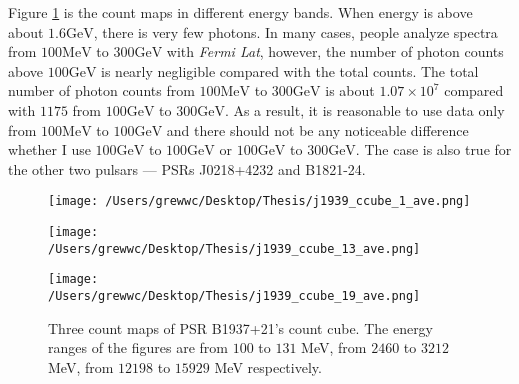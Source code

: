 \documentclass[12pt]{report}
\begin{document}
              Figure \ref{fig: j1939_count_cube_ave} is the count maps in different energy bands.
              When energy is above about $1.6\mbox{GeV}$, there is very few photons. In many cases,
              people analyze spectra from $100\mbox{MeV}$ to $300\mbox{GeV}$ with 
              \textit{Fermi Lat}, however, the number of photon counts above $100\mbox{GeV}$ is 
              nearly negligible compared with the total counts. The total number of photon counts 
              from $100\mbox{MeV}$ to $300\mbox{GeV}$ is about $1.07\times10^7$ compared with 
              $1175$ from $100\mbox{GeV}$ to $300\mbox{GeV}$. As a result, it is reasonable to 
              use data only from $100\mbox{MeV}$ to $100\mbox{GeV}$ and there should not be any 
              noticeable difference whether I use $100\mbox{GeV}$ to $100\mbox{GeV}$ or 
              $100\mbox{GeV}$ to $300\mbox{GeV}$. The case is also true for 
              the other two pulsars --- PSRs J0218+4232 and B1821-24. 

            \begin{figure}[!htp]
              \begin{minipage}{0.32\textwidth}
                \begin{center} 
                  \texttt{[image: /Users/grewwc/Desktop/Thesis/j1939\_ccube\_1\_ave.png]}
                \end{center}
              \end{minipage}
              \begin{minipage}{0.32\textwidth}
                \begin{center}
                  \texttt{[image: /Users/grewwc/Desktop/Thesis/j1939\_ccube\_13\_ave.png]}
                \end{center}
              \end{minipage}
              \begin{minipage}{0.32\textwidth}
                \begin{center}
                \texttt{[image: /Users/grewwc/Desktop/Thesis/j1939\_ccube\_19\_ave.png]}
                \end{center}
              \end{minipage}
              \caption{Three count maps of PSR B1937+21's count cube. The energy ranges of the 
                figures are from $100$ to $131$ MeV, from $2460$ to $3212$ MeV, from $12198$ to
                $15929$ MeV respectively.}
              \label{fig: j1939_count_cube_ave}
            \end{figure}
\end{document}
